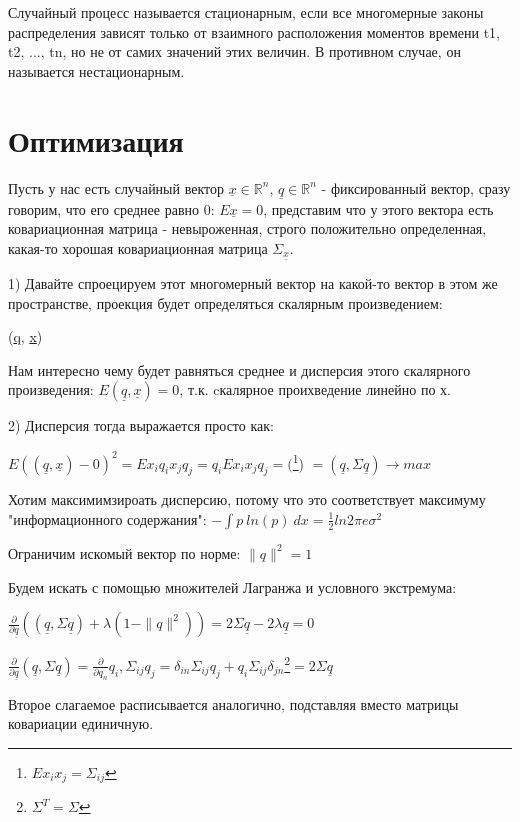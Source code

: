 \documentclass[a4paper, 12pt]{article}
\begin{document}
	Случайный процесс называется стационарным, если все многомерные законы распределения зависят только от взаимного расположения моментов
	времени t1, t2, ..., tn, но не от самих значений этих величин. В противном случае, он называется нестационарным.
	
	\section*{Оптимизация}
	Пусть у нас есть случайный вектор $\underline{x} \in \mathbb {R}^n$, $\underline{q} \in \mathbb {R}^n$ - фиксированный вектор, сразу говорим, что его среднее равно 0: $E\underline{x}=0$, представим что у этого вектора есть ковариационная матрица - невыроженная, строго положительно определенная, какая-то хорошая ковариационная матрица $\Sigma_{\underline{x}}$. 
	
	1) Давайте спроецируем этот многомерный вектор на какой-то вектор в этом же пространстве, проекция будет определяться скалярным произведением:
	
	(\underline{q}, \underline{x})
	
	Нам интересно чему будет равняться среднее и дисперсия этого скалярного произведения: $E(\underline{q}, \underline{x})=0$, т.к. cкалярное проихведение линейно по х. 
	
	2) Дисперсия тогда выражается просто как:
	
	$E((\underline{q}, \underline{x})-0)^2= Ex_iq_ix_jq_j = q_iEx_ix_jq_j = ($\footnote{$Ex_ix_j = \Sigma_{ij}$}) $= (\underline{q}, \Sigma \underline{q}) \rightarrow max$
	
	Хотим максимимзироать дисперсию, потому что это соответствует максимуму "информационного содержания": $-\int p \:ln (p)\: dx = \frac{1}{2} ln 2 \pi e \sigma^2$
	
	Ограничим искомый вектор по норме: $\|q\|^2=1$
	
	Будем искать с помощью множителей Лагранжа и условного экстремума:
	
	$\frac{\partial }{\partial \underline{q}}((\underline{q}, \Sigma \underline{q}) + \lambda (1 - \|q\|^2)) = 2 \Sigma\underline{q} - 2 \lambda \underline{q} = 0$ 
	
	$\frac{\partial }{\partial \underline{q}}(\underline{q}, \Sigma \underline{q})  = \frac{\partial }{\partial q_n}q_i, \Sigma_{ij} q_j =\delta_{in}\Sigma_{ij} q_j + q_i\Sigma_{ij}\delta_{jn} $\footnote{$\Sigma^T = \Sigma$}$ =2\Sigma\underline{q}$
	
	Второе слагаемое расписывается аналогично, подставляя вместо матрицы ковариации единичную.
	
\end{document}
